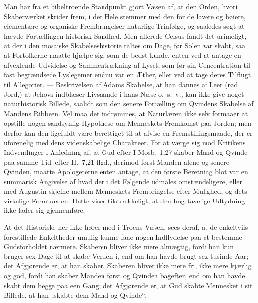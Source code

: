 \documentclass[12pt]{book}
\begin{document}
Man har fra et bibeltroende Standpunkt gjort Væsen af, at den Orden,
hvori Skaberværket skrider frem, i det Hele stemmer med den for de
lavere og høiere, elementære og organiske Frembringelser naturlige
Trinfølge, og saaledes søgt at hævde Fortællingen historisk Sandhed.
Men allerede Celsus fandt det urimeligt, at der i den mosaiske
Skabelseshistorie taltes om Dage, før Solen var skabt, saa at
Fortolkerne maatte hjælpe sig, som de bedst kunde, enten ved at
antage en afvexlende Udvidelse og Sammentrækning af Lyset, som før
sin Concentration til fast begrændsede Lyslegemer endnu var en
Æther, eller ved at tage deres Tilflugt til Allegorier. ---
Beskrivelsen af Adams Skabelse, at han dannes af Leer (rød Jord,)
at Jehova indblæser Livsaande i hans Næse o.\ s.\ v., kan ikke give
noget naturhistorisk Billede, saalidt som den senere Fortælling om
Qvindens Skabelse af Mandens Ribbeen. Vel maa det indrømmes, at
Naturlæren ikke selv formaaer at opstille nogen sandsynlig Hypothese
om Menneskets Fremkomst paa Jorden; men derfor kan den ligefuldt
være berettiget til at afvise en Fremstillingsmaade, der er
uforenelig med dens videnskabelige Charakteer. For at værge sig mod
Kritikens Indvendinger i Anledning af, at Gud efter I Mosb.\ 1,27
skaber Mand og Qvinde paa samme Tid, efter II.\ 7,21 flgd.,
derimod først Manden alene og senere Qvinden, maatte Apologeterne
enten antage, at den første Beretning blot var en summarisk Angivelse
af hvad der i det Følgende udmales omstændeligere, eller med
Augustin skjelne mellem Menneskets Frembringelse efter Mulighed, og
dets virkelige Fremtræden. Dette viser tilstrækkeligt, at den
bogstavelige Udtydning ikke lader sig gjennemføre.

At det Historiske her ikke hører med i Troens Væsen, sees deraf, at
de enkeltviis forestillede Enkeltheder umulig kunne faae nogen
Indflydelse paa at bestemme Gudsforholdet nærmere. Skaberen bliver
ikke mere almægtig, fordi han kun bruger sex Dage til at skabe
Verden i, end om han havde brugt sex tusinde Aar; det Afgjørende er,
at han skaber. Skaberen bliver ikke mere fri, ikke mere kjærlig og
god, fordi han skaber Manden først og Qvinden bagefter, end om han
havde skabt dem begge paa een Gang; det Afgjørende er, at Gud skabte
Mennesket i sit Billede, at han „skabte dem Mand og Qvinde“.
\end{document}
